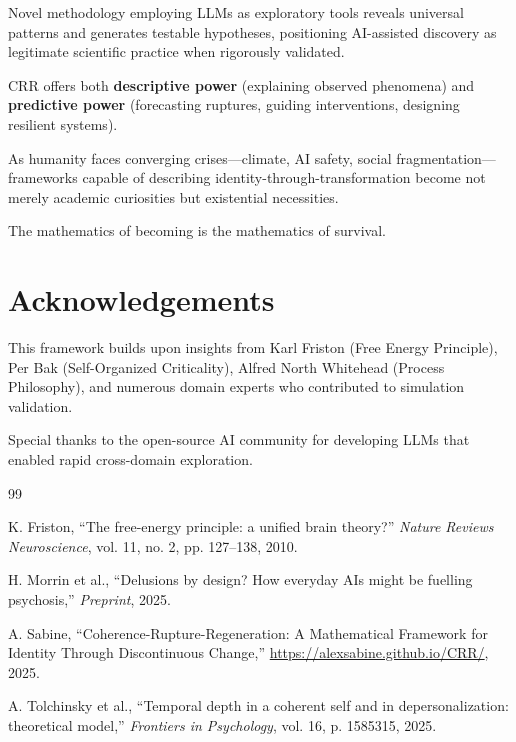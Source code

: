 \documentclass[11pt,a4paper]{article}
\theoremstyle{definition}
\theoremstyle{remark}
\begin{document}
Novel methodology employing LLMs as exploratory tools reveals universal patterns and generates testable hypotheses, positioning AI-assisted discovery as legitimate scientific practice when rigorously validated.

CRR offers both \textbf{descriptive power} (explaining observed phenomena) and \textbf{predictive power} (forecasting ruptures, guiding interventions, designing resilient systems).

As humanity faces converging crises—climate, AI safety, social fragmentation—frameworks capable of describing identity-through-transformation become not merely academic curiosities but existential necessities.

The mathematics of becoming is the mathematics of survival.

\section*{Acknowledgements}

This framework builds upon insights from Karl Friston (Free Energy Principle), Per Bak (Self-Organized Criticality), Alfred North Whitehead (Process Philosophy), and numerous domain experts who contributed to simulation validation.

Special thanks to the open-source AI community for developing LLMs that enabled rapid cross-domain exploration.


\begin{thebibliography}{99}

K. Friston, ``The free-energy principle: a unified brain theory?''
\textit{Nature Reviews Neuroscience}, vol. 11, no. 2, pp. 127–138, 2010.

H. Morrin et al., ``Delusions by design? How everyday AIs might be fuelling psychosis,''
\textit{Preprint}, 2025.

A. Sabine, ``Coherence-Rupture-Regeneration: A Mathematical Framework for Identity Through Discontinuous Change,''
\url{https://alexsabine.github.io/CRR/}, 2025.

A. Tolchinsky et al., ``Temporal depth in a coherent self and in depersonalization: theoretical model,''
\textit{Frontiers in Psychology}, vol. 16, p. 1585315, 2025.

\end{thebibliography}

\appendix
\end{document}
